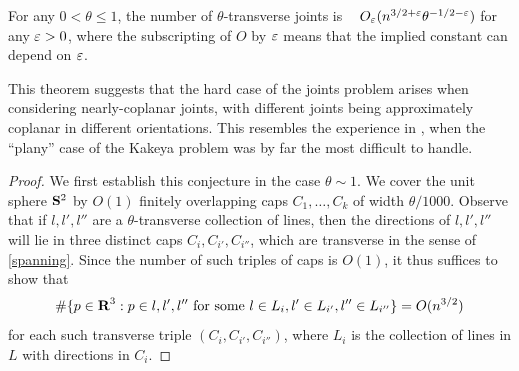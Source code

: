 \begin{theorem}\label{joints-thm}  For any $0 < \theta \leq 1$, the number of
$\theta$-transverse joints is $\;\;$ $O_\varepsilon( n^{3/2+\varepsilon}
\theta^{-1/2-\varepsilon} )$
for any $\varepsilon > 0$, where the subscripting of $O$ by $\varepsilon$ means
that the implied constant can depend on $\varepsilon$.
\end{theorem}

This theorem suggests that the hard case of the joints problem
arises when considering nearly-coplanar joints, with different
joints being approximately coplanar in different orientations.
This resembles the experience in \cite{KLT}, when the ``plany''
case of the Kakeya problem was by far the most difficult to
handle.

\begin{proof} We first establish this conjecture in the case $\theta \sim 1$.
We cover the unit sphere ${\bf S}^2$ by $O(1)$ finitely
overlapping caps $C_1,\ldots,C_k$ of width $\theta/1000$.  Observe
that if $l,l',l''$ are a $\theta$-transverse collection of lines,
then the directions of $l,l',l''$ will lie in three distinct
caps $C_i, C_{i'}, C_{i''}$, which are transverse in the sense of
\eqref{spanning}. Since the number of such triples of caps is
$O(1)$, it thus suffices to show that
\begin{equation}\label{triple-joint}
\# \{ p \in {\hbox{\bf R}}^3: p \in l, l', l'' \hbox{ for some } l \in L_i, l'
\in L_{i'}, l'' \in L_{i''} \} = O(n^{3/2})
\end{equation}
for each such transverse triple $(C_i, C_{i'}, C_{i''})$, where
$L_i$ is the collection of lines in $L$ with directions in
$C_i$.


\end{proof}
